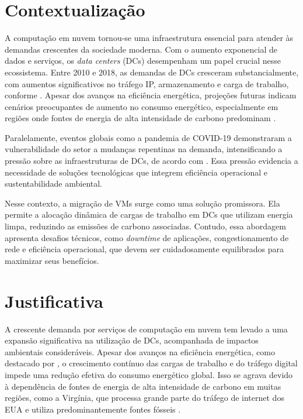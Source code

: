 \documentclass[
	12pt,				%
	oneside,			%
	a4paper,			%
	english,			%
	brazil				%
	]{abntex2ppgsi}
\begin{document}
\section{Contextualização}
A computação em nuvem tornou-se uma infraestrutura essencial para atender às demandas crescentes da sociedade moderna. Com o aumento exponencial de dados e serviços, os \textit{data centers} (DCs) desempenham um papel crucial nesse ecossistema. Entre 2010 e 2018, as demandas de DCs cresceram substancialmente, com aumentos significativos no tráfego IP, armazenamento e carga de trabalho, conforme . Apesar dos avanços na eficiência energética, projeções futuras indicam cenários preocupantes de aumento no consumo energético, especialmente em regiões onde fontes de energia de alta intensidade de carbono predominam \cite{KOOT2021116798}.

Paralelamente, eventos globais como a pandemia de COVID-19 demonstraram a vulnerabilidade do setor a mudanças repentinas na demanda, intensificando a pressão sobre as infraestruturas de DCs, de acordo com . Essa pressão evidencia a necessidade de soluções tecnológicas que integrem eficiência operacional e sustentabilidade ambiental.

Nesse contexto, a migração de VMs surge como uma solução promissora. Ela permite a alocação dinâmica de cargas de trabalho em DCs que utilizam energia limpa, reduzindo as emissões de carbono associadas. Contudo, essa abordagem apresenta desafios técnicos, como \textit{downtime} de aplicações, congestionamento de rede e eficiência operacional, que devem ser cuidadosamente equilibrados para maximizar seus benefícios.

\section{Justificativa}
A crescente demanda por serviços de computação em nuvem tem levado a uma expansão significativa na utilização de DCs, acompanhada de impactos ambientais consideráveis. Apesar dos avanços na eficiência energética, como destacado por , o crescimento contínuo das cargas de trabalho e do tráfego digital impede uma redução efetiva do consumo energético global. Isso se agrava devido à dependência de fontes de energia de alta intensidade de carbono em muitas regiões, como a Virgínia, que processa grande parte do tráfego de internet dos EUA e utiliza predominantemente fontes fósseis \cite{clicking_clean_virginia}.
\end{document}
